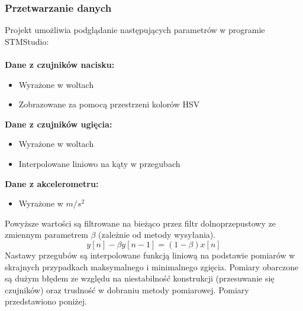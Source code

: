 \documentclass[12pt,a4paper]{article}
\begin{document}
\subsubsection{Przetwarzanie danych}
Projekt umożliwia podglądanie następujących parametrów w programie STMStudio:\\\\
\textbf{Dane z czujników nacisku:}
\begin{itemize}
\item Wyrażone w woltach
\item Zobrazowane za pomocą przestrzeni kolorów HSV
\end{itemize}
\textbf{Dane z czujników ugięcia:}
\begin{itemize}
\item Wyrażone w woltach
\item Interpolowane liniowo na kąty w przegubach
\end{itemize}
\textbf{Dane z akcelerometru:}
\begin{itemize}
\item Wyrażone w $m/s^2$
\end{itemize}
Powyższe wartości są filtrowane na bieżąco przez filtr dolnoprzepustowy ze zmiennym parametrem $\beta$ (zależnie od metody wysyłania).
\begin{equation} \label{eq:1}
y[n] - \beta y[n-1] = (1-\beta)x[n]
\end{equation}
Nastawy przegubów są interpolowane funkcją liniową na podstawie pomiarów w skrajnych przypadkach maksymalnego i minimalnego zgięcia. Pomiary obarczone są dużym błędem ze względu na niestabilność konstrukcji (przesuwanie się czujników) oraz trudność w dobraniu metody pomiarowej. Pomiary przedstawiono poniżej.
\end{document}
